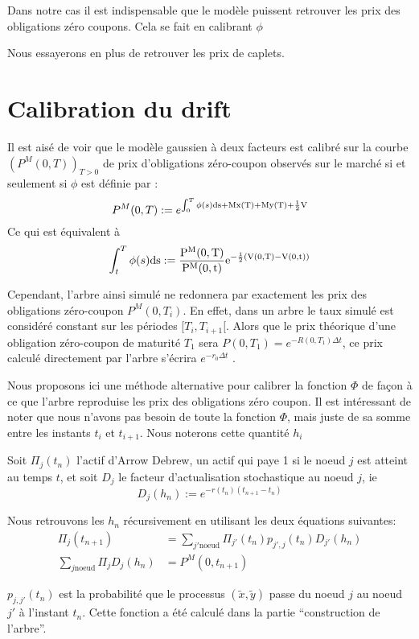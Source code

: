 Dans notre cas il est indispensable que le modèle puissent retrouver les prix des obligations zéro coupons. Cela se fait en calibrant $\phi$

Nous essayerons en plus de retrouver les prix de caplets.

\section{Calibration du drift}
Il est aisé de voir que le modèle gaussien à deux facteurs est calibré sur la courbe $(P^M (0, T ))_{ T > 0}$ de prix d’obligations zéro-coupon observés sur le marché si et seulement si $\phi$ est définie par :
$$P^M(0, T) := e^{ \int_0^T \phi(s) \rm{d}s + M x(T) +M y(T) + \frac{1}{2} V}$$
Ce qui est équivalent à 
$$ \int_t^T \phi(s) \rm{d}s := \frac{P^M(0, T)}{P^M(0, t)} e^{-\frac{1}{2}(V(0, T) - V(0, t))}$$

Cependant, l’arbre ainsi simulé ne redonnera par exactement les prix des
obligations zéro-coupon $P^M(0, T_i)$. En effet, dans un arbre le taux simulé est
considéré constant sur les périodes $[T_i, T_{i+1}[$. Alors que le prix théorique d’une obligation zéro-coupon de maturité $T_1$ sera $P(0, T_1 ) = e^{-R(0, T_1) \Delta t}$, ce prix calculé directement par l’arbre s’écrira $e^{-r_0\Delta t}$ .

Nous proposons ici une méthode alternative pour calibrer la fonction $\Phi$ de façon à ce que l'arbre reproduise les prix des obligations zéro coupon.
Il est intéressant de noter que nous n'avons pas besoin de toute la fonction $\Phi$, mais juste de sa somme entre les instants $t_i$ et $t_{i+1}$. Nous noterons cette quantité $h_i$

Soit $\Pi_j(t_n)$ l'actif d'Arrow Debrew, un actif qui paye 1 si le noeud $j$ est atteint au temps $t$, et soit $D_j$ le facteur d'actualisation stochastique au noeud $j$, ie
$$D_j(h_n) := e^{- r(t_n) (t_{n+1} - t_n)} $$

Nous retrouvons les $h_n$ récursivement en utilisant les deux équations suivantes:
\begin{align}
  \Pi_j(t_{n+1}) &= \sum_{j' \text{noeud}} \Pi_{j'}(t_n) p_{j', j}(t_n) D_{j'}(h_n) \\
  \sum_{ j \text{noeud} } \Pi_j D_j(h_n) &= P^M(0, t_{n+1})
\end{align}

$p_{j, j'}(t_n)$ est la probabilité que le processus $(\widetilde x, \widetilde y)$ passe du noeud $j$ au noeud $j'$ à l'instant $t_n$. Cette fonction a été calculé dans la partie ``construction de l'arbre''.

